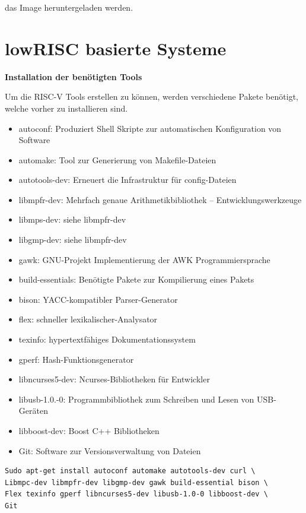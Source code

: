 das Image heruntergeladen werden.
\newpage
\section{lowRISC basierte Systeme}\label{kap:lowrisc}

\textbf{Installation der benötigten Tools}

Um die RISC-V Tools erstellen zu können, werden verschiedene Pakete benötigt, welche vorher zu installieren sind.
\begin{itemize}
  \item autoconf: Produziert Shell Skripte zur automatischen Konfiguration von Software
  \item automake: Tool zur Generierung von Makefile-Dateien
  \item autotools-dev: Erneuert die Infrastruktur für config-Dateien
  \item libmpfr-dev: Mehrfach genaue Arithmetikbibliothek – Entwicklungswerkzeuge
  \item libmps-dev: siehe libmpfr-dev
  \item libgmp-dev: siehe libmpfr-dev
  \item gawk: GNU-Projekt Implementierung der AWK Programmiersprache
  \item build-essentials: Benötigte Pakete zur Kompilierung eines Pakets
  \item bison: YACC-kompatibler Parser-Generator
  \item flex: schneller lexikalischer-Analysator
  \item texinfo: hypertextfähiges Dokumentationssystem
  \item gperf: Hash-Funktionsgenerator
  \item libncurses5-dev: Ncurses-Bibliotheken für Entwickler
  \item libusb-1.0.-0: Programmbibliothek zum Schreiben und Lesen von USB-Geräten
  \item libboost-dev: Boost C++ Bibliotheken
  \item Git: Software zur Versionsverwaltung von Dateien
\end{itemize}


\begin{lstlisting}[caption={Installation der benötigten RISC-V-Tools},label={code:riscvtools}]
Sudo apt-get install autoconf automake autotools-dev curl \
Libmpc-dev libmpfr-dev libgmp-dev gawk build-essential bison \
Flex texinfo gperf libncurses5-dev libusb-1.0-0 libboost-dev \
Git
\end{lstlisting}


